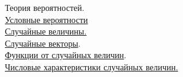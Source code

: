 \documentclass[a4paper]{article}
\begin{document}
Теория вероятностей. \\


\underline{Условные вероятности} \\


\underline{Случайные величины.} \\


\underline{Случайные векторы}. \\


\underline{Функции от случайных величин}. \\


\newpage
\underline{Числовые характеристики случайных величин.}\\

\end{document}
